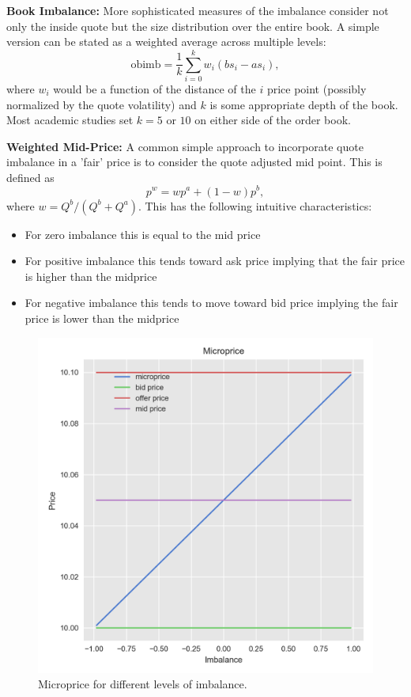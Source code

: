 \noindent\textbf{Book Imbalance:} More sophisticated measures of the imbalance consider not only the inside quote but the size distribution over the entire book. A simple version can be stated as a weighted average across multiple levels:
	\begin{equation} \label{eq:microprc}
	\text{obimb} = \frac{1}{k}\sum_{i=0}^k w_i (bs_i-  as_i),
	\end{equation}
where $w_i$ would be a function of the distance of the $i$ price point (possibly normalized by the quote volatility) and $k$ is some appropriate depth of the book. Most academic studies set $k=5$ or $10$ on either side of the order book. \twomedskip


\noindent\textbf{Weighted Mid-Price:} A common simple approach to incorporate quote imbalance in a 'fair' price is to consider the quote adjusted mid point. This is defined as
	\begin{equation} \label{eqn:microprice}
		p^w= w p^a + (1-w) p^b,
	\end{equation}
where $w= Q^b/(Q^b+Q^a)$. This has the following intuitive characteristics: 
	\begin{itemize}
	\item For zero imbalance this is equal to the mid price
	\item For positive imbalance this tends toward ask price implying that the fair price is higher than the midprice
	\item For negative imbalance this tends to move toward bid price implying the fair price is lower than the midprice
	\end{itemize}

	\begin{figure}[!ht]
	\centering
	\includegraphics[width=\textwidth]{chapters/chapter_trade_data_models/figures/microprice.png} 
	\caption{Microprice for different levels of imbalance. \label{fig:microprice}}
	\end{figure}


